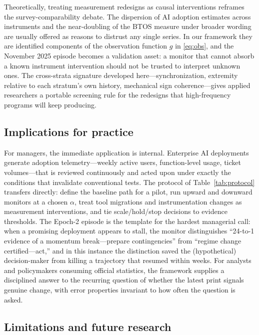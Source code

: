 \documentclass[review,authoryear,12pt]{elsarticle}
\begin{document}
Theoretically, treating measurement redesigns as causal interventions reframes the survey-comparability debate. The dispersion of AI adoption estimates across instruments \citep{crane2025} and the near-doubling of the BTOS measure under broader wording \citep{bick2026} are usually offered as reasons to distrust any single series. In our framework they are identified components of the observation function $g$ in \eqref{eq:obs}, and the November 2025 episode becomes a validation asset: a monitor that cannot absorb a known instrument intervention should not be trusted to interpret unknown ones. The cross-strata signature developed here---synchronization, extremity relative to each stratum's own history, mechanical sign coherence---gives applied researchers a portable screening rule for the redesigns that high-frequency programs will keep producing.

\subsection{Implications for practice}

For managers, the immediate application is internal. Enterprise AI deployments generate adoption telemetry---weekly active users, function-level usage, ticket volumes---that is reviewed continuously and acted upon under exactly the conditions that invalidate conventional tests. The protocol of Table~\ref{tab:protocol} transfers directly: define the baseline path for a pilot, run upward and downward monitors at a chosen $\alpha$, treat tool migrations and instrumentation changes as measurement interventions, and tie scale/hold/stop decisions to evidence thresholds. The Epoch-2 episode is the template for the hardest managerial call: when a promising deployment appears to stall, the monitor distinguishes ``24-to-1 evidence of a momentum break---prepare contingencies'' from ``regime change certified---act,'' and in this instance the distinction saved the (hypothetical) decision-maker from killing a trajectory that resumed within weeks. For analysts and policymakers consuming official statistics, the framework supplies a disciplined answer to the recurring question of whether the latest print signals genuine change, with error properties invariant to how often the question is asked.

\subsection{Limitations and future research}
\end{document}
